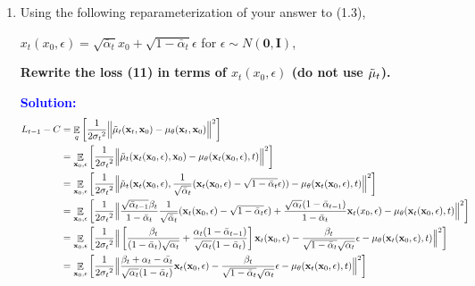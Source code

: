 \documentclass{article}
\DeclareMathOperator{\EX}{\mathbb{E}}%
\begin{document}
\begin{enumerate}
    \item 
    Using the following reparameterization of your answer to (1.3), 
    
    ${x_t}(x_0, \epsilon) = \sqrt{\bar\alpha_t}x_0 + \sqrt{1 - \bar\alpha_t}\epsilon $  for $\epsilon \sim N(\boldsymbol{0}, \boldsymbol{I})$, 
    
    \textbf{Rewrite the loss (11) in terms of ${x_t}(x_0, \epsilon)$ (do not use $\Tilde\mu_t$).}

\textcolor{blue}{
    \textbf{Solution: } 
    \begin{align*}
    L_{t-1} - C &= \EX_q\left[\frac{1}{2{\sigma_t}^2}
    \Big\lVert{\Tilde\mu_t}(\textbf{x}_t, \textbf{x}_0) - {\mu_\theta}(\textbf{x}_t, \textbf{x}_0)\Big\rVert^2\right] \\
    &= \EX_{\textbf{x}_0, \epsilon}\left[\frac{1}{2{\sigma_t}^2}
    \Big\lVert{\Tilde\mu_t}(\textbf{x}_t(\textbf{x}_0, \epsilon), \textbf{x}_0) - {\mu_\theta}(\textbf{x}_t(\textbf{x}_0, \epsilon), t)\Big\rVert^2\right] \\
    &= \EX_{\textbf{x}_0, \epsilon}\left[\frac{1}{2{\sigma_t}^2}
    \Big\lVert{\Tilde\mu_t}(\textbf{x}_t(\textbf{x}_0, \epsilon), \frac{1}{\sqrt{\Bar{\alpha}_t}}(\textbf{x}_t(\textbf{x}_0, \epsilon) - \sqrt{1 - \Bar{\alpha}_t}\epsilon)) - {\mu_\theta}(\textbf{x}_t(\textbf{x}_0, \epsilon), t)\Big\rVert^2\right] \\
    &= \EX_{\textbf{x}_0, \epsilon}\left[\frac{1}{2{\sigma_t}^2}
    \Big\lVert \frac{\sqrt{\Bar{\alpha}_{t-1}}\beta_t}{1 - \Bar{\alpha}_t}\frac{1}{\sqrt{\Bar{\alpha}_t}}(\textbf{x}_t(\textbf{x}_0, \epsilon) - \sqrt{1 - \Bar{\alpha}_t}\epsilon) + \frac{\sqrt{\alpha_t}(1 - \Bar{\alpha}_{t-1})}{1 - \Bar{\alpha}_t}\textbf{x}_t(x_0, \epsilon) - {\mu_\theta}(\textbf{x}_t(\textbf{x}_0, \epsilon), t)\Big\rVert^2\right]\\
    &= \EX_{\textbf{x}_0, \epsilon}\left[\frac{1}{2{\sigma_t}^2}
    \Big\lVert \left[\frac{\beta_t}{(1 - \Bar{\alpha}_t)\sqrt{\alpha_t}} + \frac{\alpha_t(1 - \Bar{\alpha}_{t - 1})}{\sqrt{\alpha_t}(1 - \Bar{\alpha}_t)}\right]\textbf{x}_t(\textbf{x}_0, \epsilon) - \frac{\beta_t}{\sqrt{1 - \Bar{\alpha}_t}\sqrt{\alpha_t}}\epsilon - {\mu_\theta}(\textbf{x}_t(\textbf{x}_0, \epsilon), t)\Big\rVert^2\right]\\
    &= \EX_{\textbf{x}_0, \epsilon}\left[\frac{1}{2{\sigma_t}^2}
    \Big\lVert \frac{\beta_t + \alpha_t - \Bar{\alpha_t}}{\sqrt{\alpha_t}(1 - \Bar{\alpha}_t)}\textbf{x}_t(\textbf{x}_0, \epsilon) - \frac{\beta_t}{\sqrt{1 - \Bar{\alpha}_t}\sqrt{\alpha_t}}\epsilon - {\mu_\theta}(\textbf{x}_t(\textbf{x}_0, \epsilon), t)\Big\rVert^2\right]\\

\end{align*}}
\end{enumerate}
\end{document}
